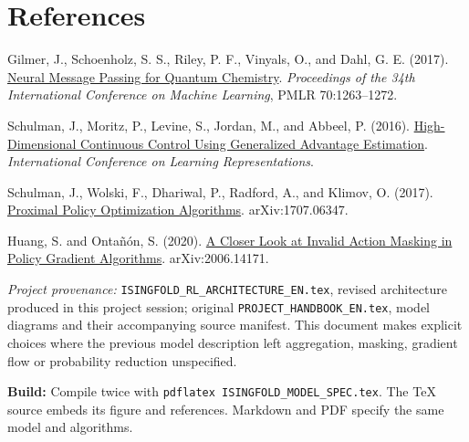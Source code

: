 \documentclass[10pt,a4paper]{article}
\begin{document}
\hypertarget{references}{%
\section*{References}\label{references}}

Gilmer, J., Schoenholz, S. S., Riley, P. F., Vinyals, O., and Dahl, G.
E. (2017).
\href{https://proceedings.mlr.press/v70/gilmer17a.html}{Neural Message
Passing for Quantum Chemistry}. \emph{Proceedings of the 34th
International Conference on Machine Learning}, PMLR 70:1263--1272.

Schulman, J., Moritz, P., Levine, S., Jordan, M., and Abbeel, P. (2016).
\href{https://arxiv.org/abs/1506.02438}{High-Dimensional Continuous
Control Using Generalized Advantage Estimation}. \emph{International
Conference on Learning Representations}.

Schulman, J., Wolski, F., Dhariwal, P., Radford, A., and Klimov, O.
(2017). \href{https://arxiv.org/abs/1707.06347}{Proximal Policy
Optimization Algorithms}. arXiv:1707.06347.

Huang, S. and Ontañón, S. (2020).
\href{https://arxiv.org/abs/2006.14171}{A Closer Look at Invalid Action
Masking in Policy Gradient Algorithms}. arXiv:2006.14171.

\emph{Project provenance:} \texttt{ISINGFOLD\_RL\_ARCHITECTURE\_EN.tex},
revised architecture produced in this project session; original
\texttt{PROJECT\_HANDBOOK\_EN.tex}, model diagrams and their
accompanying source manifest. This document makes explicit choices where
the previous model description left aggregation, masking, gradient flow
or probability reduction unspecified.

\textbf{Build:} Compile twice with
\texttt{pdflatex\ ISINGFOLD\_MODEL\_SPEC.tex}. The TeX source embeds its
figure and references. Markdown and PDF specify the same model and
algorithms.
\end{document}
